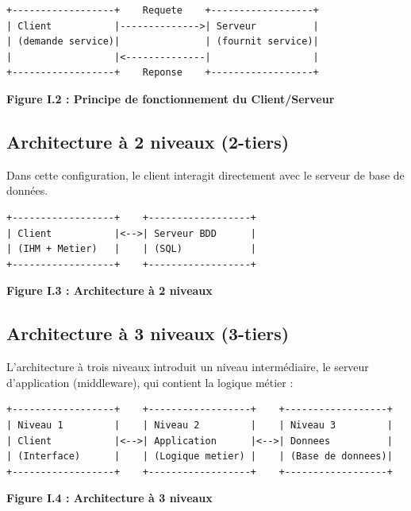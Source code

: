 \documentclass[12pt,a4paper,twoside]{report}
\begin{document}
\begin{verbatim}
+------------------+    Requete    +------------------+
| Client           |-------------->| Serveur          |
| (demande service)|               | (fournit service)|
|                  |<--------------|                  |
+------------------+    Reponse    +------------------+
\end{verbatim}

\begin{center}
\textbf{Figure I.2 : Principe de fonctionnement du Client/Serveur}
\end{center}

\subsection{Architecture à 2 niveaux (2-tiers)}

Dans cette configuration, le client interagit directement avec le serveur de base de données.

\begin{verbatim}
+------------------+    +------------------+
| Client           |<-->| Serveur BDD      |
| (IHM + Metier)   |    | (SQL)            |
+------------------+    +------------------+
\end{verbatim}

\begin{center}
\textbf{Figure I.3 : Architecture à 2 niveaux}
\end{center}

\subsection{Architecture à 3 niveaux (3-tiers)}

L'architecture à trois niveaux introduit un niveau intermédiaire, le serveur d'application (middleware), qui contient la logique métier :

\begin{verbatim}
+------------------+    +------------------+    +------------------+
| Niveau 1         |    | Niveau 2         |    | Niveau 3         |
| Client           |<-->| Application      |<-->| Donnees          |
| (Interface)      |    | (Logique metier) |    | (Base de donnees)|
+------------------+    +------------------+    +------------------+
\end{verbatim}

\begin{center}
\textbf{Figure I.4 : Architecture à 3 niveaux}
\end{center}
\end{document}
